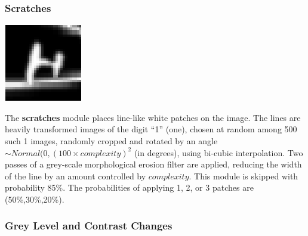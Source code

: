 \documentclass{article} %
\begin{document}
\subsubsection*{Scratches}

\begin{minipage}[t]{0.14\textwidth}
\begin{center}
\vspace*{4mm}
\includegraphics[scale=.4]{images/Rature_only.png}\\
\end{center}
\end{minipage}%
\hspace{0.3cm}\begin{minipage}[t]{0.86\linewidth}
The {\bf scratches} module places line-like white patches on the image.  The
lines are heavily transformed images of the digit ``1'' (one), chosen
at random among 500 such 1 images,
randomly cropped and rotated by an angle $\sim Normal(0,(100 \times
complexity)^2$ (in degrees), using bi-cubic interpolation.
Two passes of a grey-scale morphological erosion filter
are applied, reducing the width of the line
by an amount controlled by $complexity$.
This module is skipped with probability 85\%. The probabilities
of applying 1, 2, or 3 patches are (50\%,30\%,20\%).
\end{minipage}


\subsubsection*{Grey Level and Contrast Changes}
\end{document}
